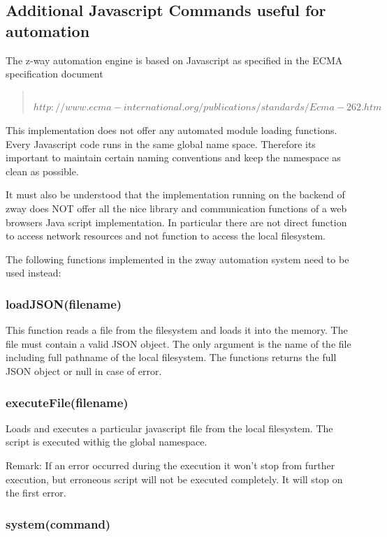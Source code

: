 \subsection{Additional Javascript Commands useful for automation}

The z-way automation engine is based on Javascript as specified in the ECMA specification document

\begin{quote}
{\tt  
$http://www.ecma-international.org/publications/standards/Ecma-262.htm$
}
\end{quote}

This implementation does not offer any automated module loading functions. Every Javascript code runs in the same global name space. Therefore its important to maintain certain naming conventions and keep the namespace as clean as possible.

It must also be understood that the implementation running on the backend of zway does NOT offer all the nice library and communication functions of a web browsers Java script implementation. In particular there are not direct function to access network resources and not function to access the local filesystem.

The following functions implemented in the zway automation system need to be used instead:

\subsubsection{loadJSON(filename)}

This function reads a file from the filesystem and loads it into the memory. The file must contain a valid JSON object. The only argument is the name of the file including full pathname of the local filesystem. The functions returns the full JSON object or null in case of error.

\subsubsection{executeFile(filename)}

Loads and executes a particular javascript file from the local filesystem.
The script is executed withig the global namespace.

Remark: If an error occurred during the execution it won't stop from further execution, but erroneous script will not be executed completely. It will stop on the first error.

\subsubsection{system(command)}

